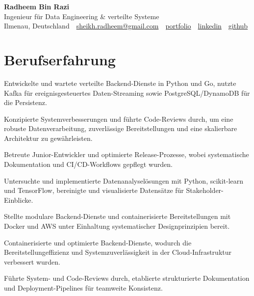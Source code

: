 \documentclass[11pt,a4paper]{resume}
\makeatletter
\newcommand{\Portfolio}{https://radheem.github.io/my-cv}
\newcommand{\PortfolioText}{portfolio}
\newcommand{\GitHub}{https://github.com/radheem}
\newcommand{\LinkedIn}{https://www.linkedin.com/in/radheem-razi}
\newcommand{\Email}{sheikh.radheem@gmail.com}
\makeatother
\begin{document}
\clearpage
{}

\begin{center}
  {\huge\bfseries Radheem Bin Razi}\\[3pt]
  {\large Ingenieur für Data Engineering \& verteilte Systeme}\\[6pt]
  \small
  Ilmenau, Deutschland \,\textbar\,
  \href{mailto:\Email}{\Email} \,\textbar\,
  \href{\Portfolio}{\PortfolioText} \,\textbar\,
  \href{\LinkedIn}{linkedin} \,\textbar\,
  \href{\GitHub}{github}
\end{center}
\vspace{2pt}

\section{Berufserfahrung}

\bullets
  \item Entwickelte und wartete verteilte Backend-Dienste in Python und Go, nutzte Kafka für ereignisgesteuertes Daten-Streaming sowie PostgreSQL/DynamoDB für die Persistenz.
  \item Konzipierte Systemverbesserungen und führte Code-Reviews durch, um eine robuste Datenverarbeitung, zuverlässige Bereitstellungen und eine skalierbare Architektur zu gewährleisten.
  \item Betreute Junior-Entwickler und optimierte Release-Prozesse, wobei systematische Dokumentation und CI/CD-Workflows gepflegt wurden.
\bulletsend
\vspace{3pt}
\bullets
  \item Untersuchte und implementierte Datenanalyselösungen mit Python, scikit-learn und TensorFlow, bereinigte und visualisierte Datensätze für Stakeholder-Einblicke.
  \item Stellte modulare Backend-Dienste und containerisierte Bereitstellungen mit Docker und AWS unter Einhaltung systematischer Designprinzipien bereit.
\bulletsend
\vspace{3pt}
\bullets
  \item Containerisierte und optimierte Backend-Dienste, wodurch die Bereitstellungeffizienz und Systemzuverlässigkeit in der Cloud-Infrastruktur verbessert wurden.
  \item Führte System- und Code-Reviews durch, etablierte strukturierte Dokumentation und Deployment-Pipelines für teamweite Konsistenz.
\bulletsend
\vspace{3pt}
\end{document}
